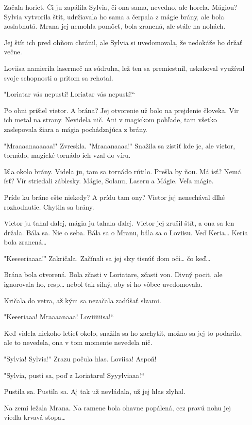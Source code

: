 \documentclass{book}
\begin{document}
Začala horieť. Či ju zapálila Sylvia, či ona sama, nevedno, ale horela. Mágiou? Sylvia vytvorila štít, udržiavala ho sama a čerpala z mágie brány, ale bola zoslabnutá. Mrana jej nemohla pomôcť, bola zranená, ale stále na nohách.

Jej štít ich pred ohňom chránil, ale Sylvia si uvedomovala, že nedokáže ho držať večne.

Loviisa namierila lasermeč na súdruha, lež ten sa premiestnil, uskakoval využíval svoje schopnosti a pritom sa rehotal.

"$ $Loriatar vás nepustí! Loriatar vás nepustí!“

Po ohni prišiel vietor. A brána? Jej otvorenie už bolo na prejdenie človeka. Vir ich metal na strany. Nevidela nič. Ani v magickom pohľade, tam všetko zaslepovala žiara a mágia pochádzajúca z brány.

"$ $Mraaaanaaaaaa!"$ $ Zvreskla. "$ $Mraaanaaaa!"$ $ Snažila sa zistiť kde je, ale vietor, tornádo, magické tornádo ich vzal do víru.

Išla okolo brány. Videla ju, tam sa tornádo rútilo. Prešla by ňou. Má ísť? Nemá ísť? Vír striedali záblesky. Mágie, Solanu, Laseru a Mágie. Veľa mágie.

Príde ku bráne ešte niekedy? A prídu tam ony? Vietor jej nenechával dlhé rozhodnutie. Chytila sa brány.

Vietor ju ťahal ďalej, mágia ju ťahala ďalej. Vietor jej zrušil štít, a ona sa len držala. Bála sa. Nie o seba. Bála sa o Mranu, bála sa o Loviisu. Veď Keria… Keria bola zranená…

"$ $Keeeeriaaaa!"$ $ Zakričala. Začínali sa jej slzy tisnúť dom očí… čo keď…

Brána bola otvorená. Bola zčasti v Loriatare, zčasti von. Divný pocit, ale ignorovala ho, resp… nebol tak silný, aby si ho vôbec uvedomovala.

Kričala do vetra, až kým sa nezačala zadúšať slzami.

"$ $Keeeriaaa! Mraaaanaaa! Loviiiiiisa!“

Keď videla niekoho letieť okolo, snažila sa ho zachytiť, možno sa jej to podarilo, ale to nevedela, ona v tom momente nevedela nič.

"$ $Sylvia! Sylvia!"$ $ Zrazu počula hlas. Loviisa! Aspoň!

"$ $Sylvia, pusti sa, poď z Loriataru! Syyylviaaa!“

Pustila sa. Pustila sa. Aj tak už nevládala, už jej hlas zlyhal.

Na zemi ležala Mrana. Na ramene bola ohavne popálená, cez pravú nohu jej viedla krvavá stopa…
\end{document}
